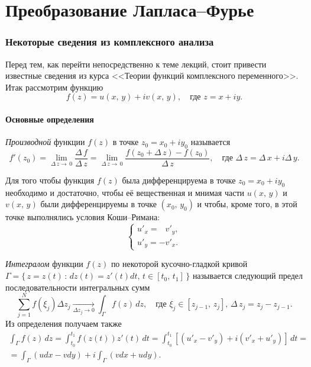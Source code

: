 \part{Преобразование Лапласа--Фурье}
\section{Некоторые сведения из комплексного анализа}
        
Перед тем, как перейти непосредственно к теме лекций, стоит привести известные сведения из курса <<Теории функций комплексного переменного>>. Итак рассмотрим функцию
$$
        f(z) = u(x,\,y) + i v(x,\,y), \quad \mbox{где } z = x + iy.
$$

\subsection{Основные определения}
\begin{definition}
        \textit{Производной} функции $f(z)$ в точке $z_0 = x_0 + i y_0$ называется
$$
        f'(z_0)
        =
        \lim_{\Delta\,z\to\,0}\frac{\Delta\,f}{\Delta\,z}
        =
        \lim_{\Delta\,z\to\,0}\frac{f(z_0+\Delta\,z)-f(z_0)}{\Delta\,z},
        \quad\mbox{где } \Delta\,z=\Delta\,x+i\Delta\,y.
$$
\end{definition}
\begin{theorem}
        Для того чтобы функция $f(z)$ была дифференцируема в точке $z_0 = x_0 + i y_0$ необходимо и достаточно, чтобы её вещественная и мнимая части $u(x,\,y)$ и $v(x,\,y)$ были дифференцируемы в точке $(x_0,\, y_0)$ и чтобы, кроме того, в этой точке выполнялись условия Коши--Римана:
$$
        \begin{cases}
u'_x = \;\;\,v'_y,\\
u'_y = -v'_x.
        \end{cases}
$$
\end{theorem}
\begin{definition}
        \textit{Интегралом} функции $f(z)$ по некоторой кусочно-гладкой кривой
        $\Gamma = \{\, z = z(t) \,:\, dz(t) = z'(t)dt,\, t \in [t_0,\,t_1]\,\}$
        называется следующий предел последовательности интегральных сумм
$$
        \sum\limits_{j=1}^{N}f(\xi_j)\Delta z_j
        \xrightarrow[\Delta z_j \to 0]{}
        \int_{\Gamma}f(z)\,dz,
        \quad
        \mbox{где }
        \xi_j \in [z_{j-1},\,z_j],\,
        \Delta\,z_j=z_j-z_{j-1}.
$$
Из определения получаем также
\begin{multline*}
        \int_{\Gamma}f(z)\,dz
        =
        \int_{t_0}^{t_1}f(z(t))z'(t)\,dt
        =
        \int_{t_0}^{t_1}\left[(u'_x-v'_y)+i(v'_x+u'_y)\right]\,dt
        =\\=
        \int_{\Gamma}(udx-vdy) + i\int_{\Gamma}(vdx+udy). 
\end{multline*}
\end{definition}

